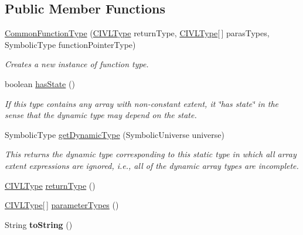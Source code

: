 \subsection*{Public Member Functions}
\begin{DoxyCompactItemize}
\item 
\hyperlink{classedu_1_1udel_1_1cis_1_1vsl_1_1civl_1_1model_1_1common_1_1type_1_1CommonFunctionType_adf372bfe848ead11b86ac6be0bce2020}{Common\+Function\+Type} (\hyperlink{interfaceedu_1_1udel_1_1cis_1_1vsl_1_1civl_1_1model_1_1IF_1_1type_1_1CIVLType}{C\+I\+V\+L\+Type} return\+Type, \hyperlink{interfaceedu_1_1udel_1_1cis_1_1vsl_1_1civl_1_1model_1_1IF_1_1type_1_1CIVLType}{C\+I\+V\+L\+Type}\mbox{[}$\,$\mbox{]} paras\+Types, Symbolic\+Type function\+Pointer\+Type)
\begin{DoxyCompactList}\small\item\em Creates a new instance of function type. \end{DoxyCompactList}\item 
boolean \hyperlink{classedu_1_1udel_1_1cis_1_1vsl_1_1civl_1_1model_1_1common_1_1type_1_1CommonFunctionType_a2d5d11b5d35a1ecdec44f91b2be0b464}{has\+State} ()
\begin{DoxyCompactList}\small\item\em If this type contains any array with non-\/constant extent, it \char`\"{}has state\char`\"{} in the sense that the dynamic type may depend on the state. \end{DoxyCompactList}\item 
Symbolic\+Type \hyperlink{classedu_1_1udel_1_1cis_1_1vsl_1_1civl_1_1model_1_1common_1_1type_1_1CommonFunctionType_a084155381111b5b587021074c9a3556b}{get\+Dynamic\+Type} (Symbolic\+Universe universe)
\begin{DoxyCompactList}\small\item\em This returns the dynamic type corresponding to this static type in which all array extent expressions are ignored, i.\+e., all of the dynamic array types are incomplete. \end{DoxyCompactList}\item 
\hyperlink{interfaceedu_1_1udel_1_1cis_1_1vsl_1_1civl_1_1model_1_1IF_1_1type_1_1CIVLType}{C\+I\+V\+L\+Type} \hyperlink{classedu_1_1udel_1_1cis_1_1vsl_1_1civl_1_1model_1_1common_1_1type_1_1CommonFunctionType_ac91ac0abddaa85eaac2d7010bf6a874d}{return\+Type} ()
\item 
\hyperlink{interfaceedu_1_1udel_1_1cis_1_1vsl_1_1civl_1_1model_1_1IF_1_1type_1_1CIVLType}{C\+I\+V\+L\+Type}\mbox{[}$\,$\mbox{]} \hyperlink{classedu_1_1udel_1_1cis_1_1vsl_1_1civl_1_1model_1_1common_1_1type_1_1CommonFunctionType_a22fd1faa06ff79d8a22d693bc78ce51b}{parameter\+Types} ()
\item 
\hypertarget{classedu_1_1udel_1_1cis_1_1vsl_1_1civl_1_1model_1_1common_1_1type_1_1CommonFunctionType_affde4e4e97d9d56e9ef8dc9fe4bdf435}{}String {\bfseries to\+String} ()\label{classedu_1_1udel_1_1cis_1_1vsl_1_1civl_1_1model_1_1common_1_1type_1_1CommonFunctionType_affde4e4e97d9d56e9ef8dc9fe4bdf435}


\end{DoxyCompactItemize}
